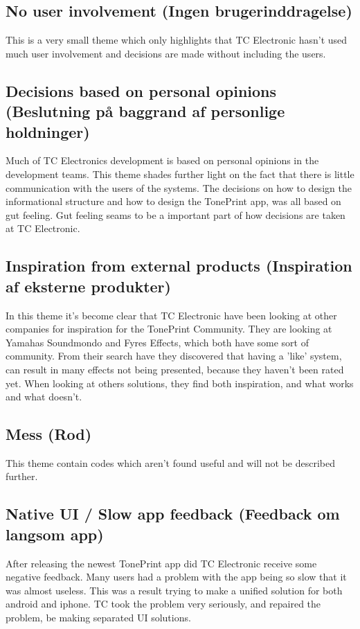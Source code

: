 \subsection*{No user involvement (Ingen brugerinddragelse)} 
\label{ThemeNoUserInvolvement}
This is a very small theme which only highlights that TC Electronic hasn't used much user involvement and decisions are made without including the users. 

\subsection*{Decisions based on personal opinions (Beslutning på baggrand af personlige holdninger)} 
\label{ThemeDecisionsBasedOnPersonalOrpinion}
Much of TC Electronics development is based on personal opinions in the development teams. This theme shades further light on the fact that there is little communication with the users of the systems. The decisions on how to design the informational structure and how to design the TonePrint app, was all based on gut feeling. Gut feeling seams to be a important part of how decisions are taken at TC Electronic.

\subsection*{Inspiration from external products (Inspiration af eksterne produkter)} 
\label{ThemeInspirationFromExternalProducts}
In this theme it's become clear that TC Electronic have been looking at other companies for inspiration for the TonePrint Community. They are looking at Yamahas Soundmondo and Fyres Effects, which both have some sort of community. From their search have they discovered that having a 'like' system, can result in many effects not being presented, because they haven't been rated yet. When looking at others solutions, they find both inspiration, and what works and what doesn't.

\subsection*{Mess (Rod)} 
\label{ThemeMess}
This theme contain codes which aren't found useful and will not be described further.

\subsection{Native UI / Slow app feedback (Feedback om langsom app)}
\label{ThemeNativeUI}
After releasing the newest TonePrint app did TC Electronic receive some negative feedback. Many users had a problem with the app being so slow that it was almost useless. This was a result trying to make a unified solution for both android and iphone. TC took the problem very seriously, and repaired the problem, be making separated UI solutions. 

